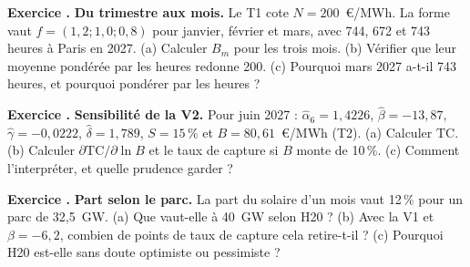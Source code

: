 \documentclass[11pt,a4paper]{article}
\newcommand{\TC}{\mathrm{TC}}
\newcounter{exo}
\newcommand{\lescorriges}{}
\newcommand{\corrigeexo}[2]{\par\medskip\noindent\textbf{Exercice #1.} #2\par}
\newcommand{\exo}[2]{\stepcounter{exo}\par\medskip\noindent\textbf{Exercice \theexo.} #1\par
  \xdef\lescorriges{\unexpanded\expandafter{\lescorriges}\noexpand\corrigeexo{\theexo}{\unexpanded{#2}}}}
\begin{document}
\exo{\textbf{Du trimestre aux mois.} Le T1 cote $N = 200$~€/MWh. La forme vaut $f = (1{,}2 ; 1{,}0 ; 0{,}8)$ pour janvier, février et mars, avec 744, 672 et 743 heures à Paris en 2027. (a) Calculer $B_m$ pour les trois mois. (b) Vérifier que leur moyenne pondérée par les heures redonne 200. (c) Pourquoi mars 2027 a-t-il 743 heures, et pourquoi pondérer par les heures ?}
{(a) $\sum f_k H_k = 892{,}8 + 672 + 594{,}4 = 2\,159{,}2$ et $\sum H_k = 2\,159$. $B_m = 200 \times f_m \times 2\,159/2\,159{,}2$ : 239,98 ; 199,98 et 159,99~€/MWh.
\par\noindent (b) $(239{,}98 \times 744 + 199{,}98 \times 672 + 159{,}99 \times 743)/2\,159 = 200{,}0$.
\par\noindent (c) Le passage à l'heure d'été, le dernier dimanche de mars, retire une heure. Un contrat trimestriel livre la même puissance à chaque heure : son prix est la moyenne par heure, pas par mois.}

\exo{\textbf{Sensibilité de la V2.} Pour juin 2027 : $\hat\alpha_6 = 1{,}4226$, $\hat\beta = -13{,}87$, $\hat\gamma = -0{,}0222$, $\hat\delta = 1{,}789$, $S = 15\,\%$ et $B = 80{,}61$~€/MWh (T2). (a) Calculer $\TC$. (b) Calculer $\partial \TC / \partial \ln B$ et le taux de capture si $B$ monte de 10\,\%. (c) Comment l'interpréter, et quelle prudence garder ?}
{(a) $\ln B = 4{,}390$. $\TC = 1{,}4226 - 13{,}87 \times 0{,}15 + (-0{,}0222 + 1{,}789 \times 0{,}15) \times 4{,}390 = 42{,}2\,\%$.
\par\noindent (b) $\gamma + \delta S = 0{,}246$. Avec $\ln 1{,}1 = 0{,}0953$, le taux monte de 2,3~points, à 44,5\,\%.
\par\noindent (c) À part solaire élevée, un niveau de prix plus haut réduit la décote : le prix du PPA monte plus que proportionnellement au baseload. Prudence : la forme a été choisie après avoir vu les données, et ses paramètres sont instables d'une calibration à l'autre.}

\exo{\textbf{Part selon le parc.} La part du solaire d'un mois vaut 12\,\% pour un parc de 32,5~GW. (a) Que vaut-elle à 40~GW selon H20 ? (b) Avec la V1 et $\beta = -6{,}2$, combien de points de taux de capture cela retire-t-il ? (c) Pourquoi H20 est-elle sans doute optimiste ou pessimiste ?}
{(a) $12 \times 40/32{,}5 = 14{,}8\,\%$.
\par\noindent (b) $-6{,}2 \times 0{,}028 = -17$~points.
\par\noindent (c) H20 suppose un facteur de charge, une consommation et un écrêtement inchangés. Si l'écrêtement aux prix négatifs ou le stockage réduisent la part injectée à midi, H20 surestime la part, donc la décote : elle est pessimiste pour la valeur du solaire. Si la consommation baisse, la part réelle est plus haute : H20 est alors optimiste. L'incertitude sur le parc n'est pas encore tirée dans le Monte-Carlo.}
\end{document}
